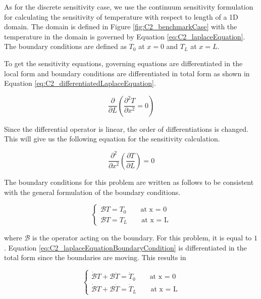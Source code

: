 As for the discrete sensitivity case, we use the continuum sensitivity formulation for calculating the sensitivity of temperature with respect to length of a 1D domain. The domain is defined in Figure \ref{fig:C2_benchmarkCase} with the temperature in the domain is governed by Equation \eqref{eq:C2_laplaceEquation}. The boundary conditions are defined as $T_0$ at $x=0$ and $T_L$ at $x=L$.

To get the sensitivity equations, governing equations are differentiated in the local form and boundary conditions are differentiated in total form as shown in Equation \eqref{eq:C2_differentiatedLaplaceEquation}.

\begin{equation}\label{eq:C2_differentiatedLaplaceEquation}
	\frac{\partial}{\partial L}
	\left( \frac{\partial^2 T}{\partial x^2} = 0 \right)
\end{equation}

Since the differential operator is linear, the order of differentiations is changed. This will give us the following equation for the sensitivity calculation.

\begin{equation}\label{eq:C2_laplaceSAequation}
	\frac{\partial^2}{\partial x^2} \left( \frac{\partial T}{\partial L} \right) = 0
\end{equation}

The boundary conditions for this problem are written as follows to be consistent with the general formulation of the boundary conditions. 

\begin{equation}\label{eq:C2_laplaceEquationBoundaryCondition}
\begin{cases}
	\mathcal{B}T = T_0 \qquad \text{at x = 0} \\
	\mathcal{B}T = T_L \qquad \text{at x = L}
\end{cases}
\end{equation}

where $\mathcal{B}$ is the operator acting on the boundary. For this problem, it is equal to $1$. Equation \eqref{eq:C2_laplaceEquationBoundaryCondition} is differentiated in the total form since the boundaries are moving. This results in

\begin{equation}
\begin{cases}
	\dot{\mathcal{B}} T + \mathcal{B} \dot{T} = \dot{T}_0 \qquad \text{at x = 0} \\
	\dot{\mathcal{B}} T + \mathcal{B} \dot{T} = \dot{T}_L \qquad \text{at x = L}
\end{cases}
\end{equation}

